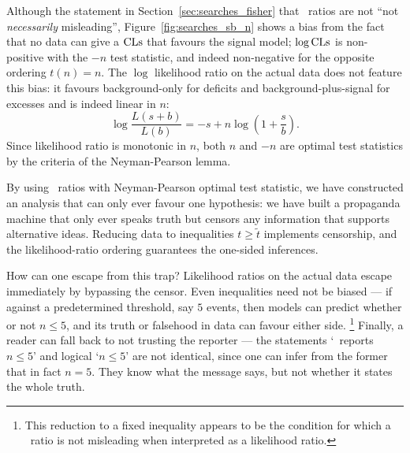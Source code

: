 Although the statement in Section~\ref{sec:searches_fisher} that \pvalue\
ratios are not ``not \emph{necessarily} misleading'',
Figure~\ref{fig:searches_sb_n} shows a bias from the fact that
no data can give a $\mathrm{CLs}$ that favours the signal model;
$\log\mathrm{CLs}$ is non-positive with the $-n$ test statistic, and indeed non-negative
for the opposite ordering $t(n) = n$.
The $\log$ likelihood ratio on the actual data does not feature this bias:
it favours background-only for deficits and background-plus-signal for
excesses and is indeed linear in $n$:
\begin{equation}
\log \frac{L(s + b)}{L(b)}
= -s + n\log(1 + \frac{s}{b})
.
\end{equation}
Since likelihood ratio is monotonic in $n$, both $n$ and $-n$ are optimal
test statistics by the criteria of the Neyman-Pearson lemma.

By using \pvalue\ ratios with Neyman-Pearson optimal test statistic, we have
constructed an analysis that can only ever favour one hypothesis:
we have built a propaganda machine that only ever speaks truth but censors any
information that supports alternative ideas.
Reducing data to inequalities $t \geq \tilde{t}$ implements censorship,
and the likelihood-ratio ordering guarantees the one-sided inferences.

How can one escape from this trap?
Likelihood ratios on the actual data escape immediately by bypassing the
censor.
Even inequalities need not be biased --- if against a predetermined threshold,
say $5$ events, then models can predict whether or not $n \leq 5$, and its
truth or falsehood in data can favour either side.%
\footnote{%
This reduction to a fixed inequality appears to be the condition for which a
\pvalue\ ratio is not misleading when interpreted as a likelihood ratio.%
}
Finally, a reader can fall back to not trusting the reporter ---
the statements `\atlas\ reports $n \leq 5$' and logical `$n \leq 5$' are not
identical, since one can infer from the former that in fact $n = 5$.
They know what the message says, but not whether it states the whole truth.


